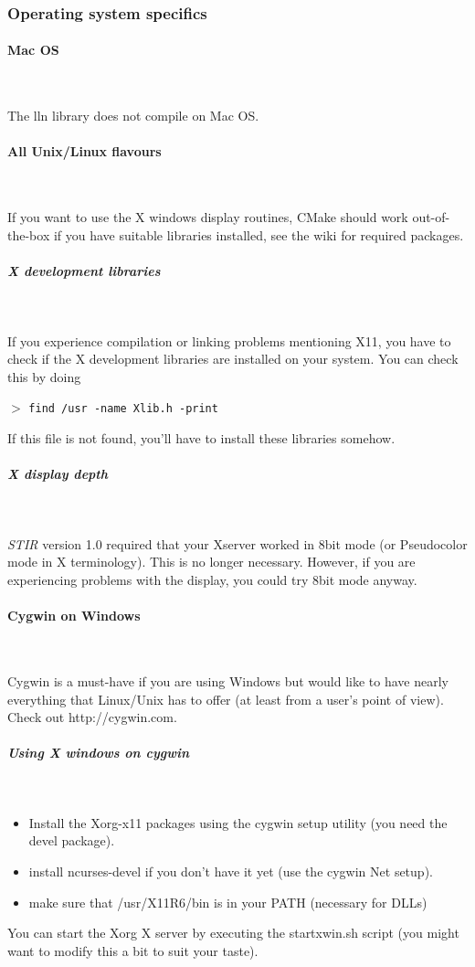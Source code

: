 \documentclass{article}
\newcommand{\subsubsubsection}[1]{\paragraph{#1}\mbox{} \\}
\newcommand{\subsubsubsubsection}[1]{\subparagraph{#1} \mbox{} \\}
\newcommand{\cmdline}[1]{\par \noindent $>$ \texttt{#1}\par}
\begin{document}
\subsubsection{
Operating system specifics}

{ \subsubsubsection{Mac OS}
}

The lln library does not compile on Mac OS. 

{ \subsubsubsection{All Unix/Linux flavours}
}

If you want to use the X windows display routines,  CMake
should work out-of-the-box if you have suitable libraries installed, see the wiki
for required packages.

{ \subsubsubsubsection{X development libraries}
}

If you experience compilation 
or linking problems mentioning X11, you have to check if the 
X development libraries are installed on your system. You can 
check this by doing
\cmdline{find /usr -name Xlib.h -print}

If this file is not found, you'll have to install these libraries 
somehow.

{ \subsubsubsubsection{X display depth}
}

\textit{STIR} version 1.0 required that your Xserver worked in 8bit 
mode (or Pseudocolor mode in X terminology). This is no longer 
necessary. However, if you are experiencing problems with the 
display, you could try 8bit mode anyway.



{ \subsubsubsection{Cygwin on Windows}
}

Cygwin is a must-have if you are using Windows but would like 
to have nearly everything that Linux/Unix has to offer (at least 
from a user's point of view). Check out http://cygwin.com.

{ \subsubsubsubsection{Using X windows on cygwin}
}
\begin{itemize}
\item Install the Xorg-x11 packages using the cygwin setup utility 
(you need the devel package).
\item 
install ncurses-devel if you don't have it yet (use the cygwin 
Net setup).
\item make sure that /usr/X11R6/bin is in your PATH (necessary 
for DLLs)
\end{itemize}

You can start the Xorg X server by executing the startxwin.sh 
script (you might want to modify this a bit to suit your taste). 
\end{document}
